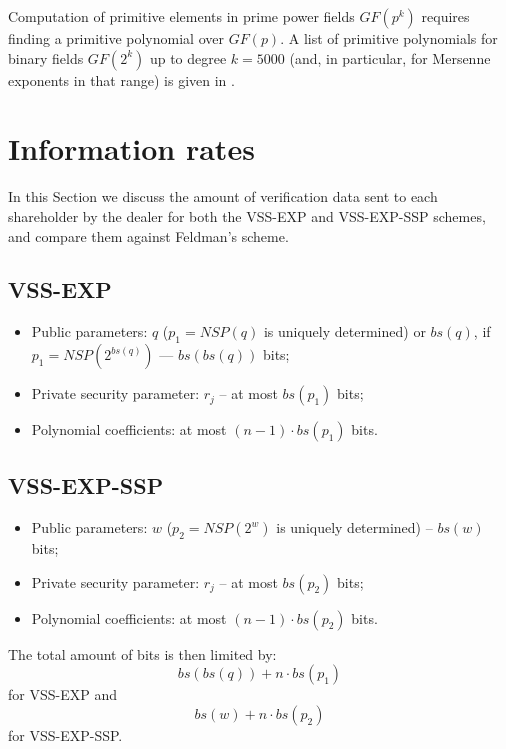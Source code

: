 \documentclass[10pt,journal,cspaper,compsoc]{IEEEtran}
\begin{document}
\begin{rem}
Computation of primitive elements in prime power
fields $GF(p^k)$ requires finding a primitive polynomial
over $GF(p)$.
A list of primitive polynomials for
binary fields $GF(2^k)$ up to degree $k=5000$
(and, in particular, for Mersenne exponents in that range)
is given in \cite{Zivkovic:1994:TPB:179653.179706}.
\end{rem}

\section{Information rates}
\label{comparison-section}
In this Section we discuss the amount of verification data sent to each shareholder by the dealer for both the VSS-EXP and VSS-EXP-SSP schemes, and compare them against Feldman's scheme.


\subsection{VSS-EXP}

\begin{itemize}
\item Public parameters: $q$ ($p_1=NSP(q)$ is uniquely determined) or $bs(q)$, if $p_1=NSP(2^{bs(q)})$ --- $bs(bs(q))$ bits;
\item Private security parameter: $r_j$ -- at most $bs(p_1)$ bits;
\item Polynomial coefficients: at most $(n-1) \cdot bs(p_1)$ bits.
\end{itemize}


\subsection{VSS-EXP-SSP}

\begin{itemize}
\item Public parameters: $w$ ($p_2=NSP(2^w)$ is uniquely determined) -- $bs(w)$ bits;
\item Private security parameter: $r_j$ -- at most $bs(p_2)$ bits;
\item Polynomial coefficients: at most $(n-1) \cdot bs(p_2)$ bits.
\end{itemize}

The total amount of bits is then limited by:
\begin{equation}
bs(bs(q))+n\cdot bs(p_1)
\end{equation}
for VSS-EXP and
\begin{equation}
bs(w) + n\cdot bs(p_2)
\end{equation}
for VSS-EXP-SSP.
\end{document}
